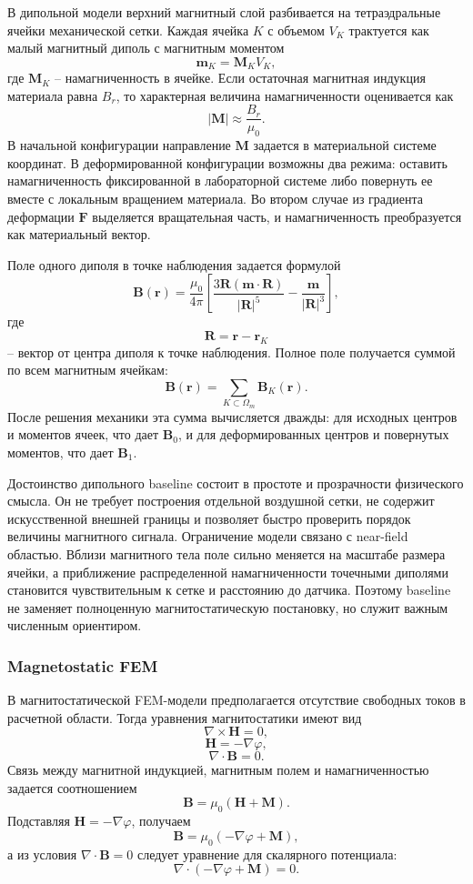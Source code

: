 \documentclass[12pt,a4paper]{article}
\begin{document}
В дипольной модели верхний магнитный слой разбивается на тетраэдральные ячейки
механической сетки. Каждая ячейка \(K\) с объемом \(V_K\) трактуется как малый
магнитный диполь с магнитным моментом
\[
    \mathbf m_K = \mathbf M_K V_K,
\]
где \(\mathbf M_K\) -- намагниченность в ячейке. Если остаточная магнитная
индукция материала равна \(B_r\), то характерная величина намагниченности
оценивается как
\[
    |\mathbf M| \approx \frac{B_r}{\mu_0}.
\]
В начальной конфигурации направление \(\mathbf M\) задается в материальной
системе координат. В деформированной конфигурации возможны два режима: оставить
намагниченность фиксированной в лабораторной системе либо повернуть ее вместе с
локальным вращением материала. Во втором случае из градиента деформации
\(\mathbf F\) выделяется вращательная часть, и намагниченность преобразуется
как материальный вектор.

Поле одного диполя в точке наблюдения задается формулой
\[
    \mathbf B(\mathbf r)
    =
    \frac{\mu_0}{4\pi}
    \left[
    \frac{3\mathbf R(\mathbf m\cdot\mathbf R)}{|\mathbf R|^5}
    -
    \frac{\mathbf m}{|\mathbf R|^3}
    \right],
\]
где
\[
    \mathbf R = \mathbf r - \mathbf r_K
\]
-- вектор от центра диполя к точке наблюдения. Полное поле получается суммой по
всем магнитным ячейкам:
\[
    \mathbf B(\mathbf r) = \sum_{K\subset\Omega_m} \mathbf B_K(\mathbf r).
\]
После решения механики эта сумма вычисляется дважды: для исходных центров и
моментов ячеек, что дает \(\mathbf B_0\), и для деформированных центров и
повернутых моментов, что дает \(\mathbf B_1\).

Достоинство дипольного baseline состоит в простоте и прозрачности физического
смысла. Он не требует построения отдельной воздушной сетки, не содержит
искусственной внешней границы и позволяет быстро проверить порядок величины
магнитного сигнала. Ограничение модели связано с near-field областью. Вблизи
магнитного тела поле сильно меняется на масштабе размера ячейки, а приближение
распределенной намагниченности точечными диполями становится чувствительным к
сетке и расстоянию до датчика. Поэтому baseline не заменяет полноценную
магнитостатическую постановку, но служит важным численным ориентиром.

\subsubsection{Magnetostatic FEM}

В магнитостатической FEM-модели предполагается отсутствие свободных токов в
расчетной области. Тогда уравнения магнитостатики имеют вид
\[
    \nabla\times\mathbf H = 0,
\]
\[
    \mathbf H = -\nabla\varphi,
\]
\[
    \nabla\cdot\mathbf B = 0.
\]
Связь между магнитной индукцией, магнитным полем и намагниченностью задается
соотношением
\[
    \mathbf B = \mu_0(\mathbf H + \mathbf M).
\]
Подставляя \(\mathbf H=-\nabla\varphi\), получаем
\[
    \mathbf B = \mu_0(-\nabla\varphi + \mathbf M),
\]
а из условия \(\nabla\cdot\mathbf B=0\) следует уравнение для скалярного
потенциала:
\[
    \nabla\cdot(-\nabla\varphi + \mathbf M)=0.
\]
\end{document}
